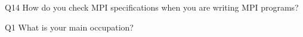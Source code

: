 \begin{description}%
\item{Q14} How do you check MPI specifications when you are writing MPI programs?%
\item{Q1} What is your main occupation?%
\end{description}%
